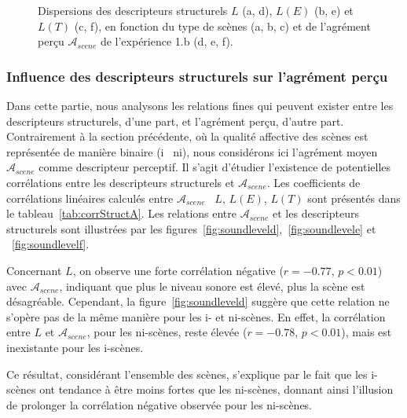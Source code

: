 \documentclass[twoside,twocolumn]{article}
\begin{document}
\begin{figure}[t]
       \caption{Dispersions des descripteurs structurels $L$ (a, d), $L(E)$ (b, e) et $L(T)$ (c, f), en fonction du type de scènes (a, b, c) et de l'agrément perçu $\mathcal{A}_{scene}$ de l'expérience 1.b (d, e, f).}
\end{figure}

\subsubsection*{Influence des descripteurs structurels sur l'agrément perçu}

Dans cette partie, nous analysons les relations fines qui peuvent exister entre les descripteurs structurels, d'une part, et l'agrément perçu, d'autre part. Contrairement à la section précédente, où la qualité affective des scènes est représentée de manière binaire (i \vs~ni), nous considérons ici l'agrément moyen $\mathcal{A}_{scene}$ comme descripteur perceptif. Il s'agit d'étudier l'existence de potentielles corrélations entre les descripteurs structurels et $\mathcal{A}_{scene}$. Les coefficients de corrélations linéaires calculés entre $\mathcal{A}_{scene}$ \vs~$L$, $L(E)$, $L(T)$ sont présentés dans le tableau~\ref{tab:corrStructA}. Les relations entre $\mathcal{A}_{scene}$ et les descripteurs structurels sont illustrées par les figures~\ref{fig:soundleveld},~\ref{fig:soundlevele} et ~\ref{fig:soundlevelf}.

Concernant $L$, on observe une forte corrélation négative ($r=-0.77$, $p<0.01$) avec $\mathcal{A}_{scene}$, indiquant que plus le niveau sonore est élevé, plus la scène est désagréable. Cependant, la figure~\ref{fig:soundleveld} suggère que cette relation ne s'opère pas de la même manière pour les i- et ni-scènes. En effet, la corrélation entre $L$ et $\mathcal{A}_{scene}$, pour les ni-scènes, reste élevée ($r=-0.78$, $p<0.01$), mais est inexistante pour les i-scènes.

Ce résultat, considérant l'ensemble des scènes, s'explique par le fait que les i-scènes ont tendance à être moins fortes que les ni-scènes, donnant ainsi l'illusion de prolonger la corrélation négative observée pour les ni-scènes.
\end{document}
